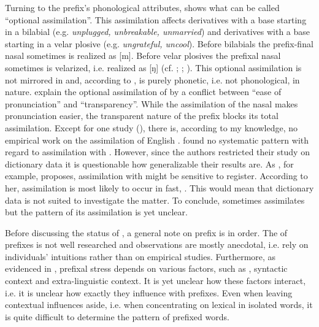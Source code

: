 Turning to the prefix's phonological attributes,  shows what can be called ``optional assimilation''. This assimilation affects derivatives with a base starting in a bilabial (e.g. \textit{unplugged, unbreakable, unmarried}) and derivatives with a base starting in a velar plosive (e.g. \textit{ungrateful, uncool}).
Before bilabials the prefix-final nasal sometimes is realized as [m]. Before velar plosives the prefixal nasal sometimes is velarized, i.e. realized as [ŋ] (cf. \citealt[5f.]{Hanote.2010}; \citealt[180]{Bauer.2013}; \citealt[125]{Okada.2013}). 
This optional assimilation is not mirrored in  and, according to \citet[125]{Okada.2013}, is purely phonetic, i.e. not phonological, in nature. \citet[87f.]{Stockwell.2001} explain the optional assimilation of  by a conflict between ``ease of pronunciation'' and ``transparency''. While the assimilation of the nasal makes pronunciation easier, the transparent nature of the prefix blocks its total assimilation.
Except for one study (\citealt{Hanote.2010}), there is, according to my knowledge, no empirical work on the assimilation of English . \cite{Hanote.2010} found no systematic pattern with regard to assimilation with . However, since the authors restricted their study on dictionary data it is questionable how generalizable their results are.  
As \citet[138]{Raffelsiefen.1999}, for example, proposes, assimilation with  might be sensitive to register.  According to her,  assimilation is most likely to occur in fast, . This would mean that dictionary data is not suited to investigate the matter.
To conclude,  sometimes assimilates but the pattern of its assimilation is yet unclear.




Before discussing the  status of , a general note on prefix  is in order. The  of prefixes is not well researched and observations are mostly anecdotal, i.e. rely on individuals' intuitions rather than on empirical studies. Furthermore, as evidenced in \cite{Videau.2015}, prefixal stress depends on various factors, such as , syntactic context and extra-linguistic context. It is yet unclear how these factors interact, i.e. it is unclear how exactly they influence  with prefixes.
Even when leaving contextual influences aside, i.e. when concentrating on lexical  in isolated words, it is quite difficult to determine the  pattern of prefixed words. 

